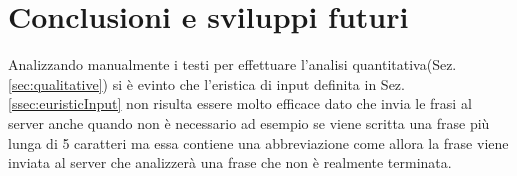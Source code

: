 \chapter{Conclusioni e sviluppi futuri}
Analizzando manualmente i testi per effettuare l'analisi quantitativa(Sez. \ref{sec:qualitative}) si è evinto che l'eristica di input definita in Sez. \ref{ssec:euristicInput} non risulta essere molto efficace dato che invia le frasi al server anche quando non è necessario ad esempio se viene scritta una frase più lunga di 5 caratteri ma essa contiene una abbreviazione come  allora la frase viene inviata al server che analizzerà una frase che non è realmente terminata.